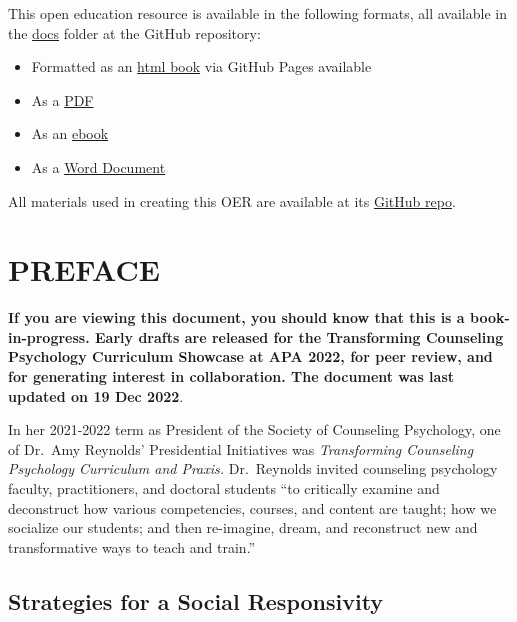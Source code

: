 \documentclass[
  11pt,
]{book}
\providecommand{\tightlist}{%
  \setlength{\itemsep}{0pt}\setlength{\parskip}{0pt}}
\begin{document}
This open education resource is available in the following formats, all available in the \href{https://github.com/lhbikos/TransformingResearchMethods/tree/main/docs}{docs} folder at the GitHub repository:

\begin{itemize}
\tightlist
\item
  Formatted as an \href{https://lhbikos.github.io/TransformingResearchMethods/}{html book} via GitHub Pages available
\item
  As a \href{https://github.com/lhbikos/TransformingResearchMethods/blob/main/docs/TransformingResearchMethods.pdf}{PDF}
\item
  As an \href{https://github.com/lhbikos/TransformingResearchMethods/blob/main/docs/TransformingResearchMethods.epub}{ebook}
\item
  As a \href{https://github.com/lhbikos/TransformingResearchMethods/blob/main/docs/TransformingResearchMethods.docx}{Word Document}
\end{itemize}

All materials used in creating this OER are available at its \href{https://github.com/lhbikos/TransformingResearchMethods}{GitHub repo}.

\hypertarget{preface}{%
\chapter*{PREFACE}\label{preface}}

\textbf{If you are viewing this document, you should know that this is a book-in-progress. Early drafts are released for the Transforming Counseling Psychology Curriculum Showcase at APA 2022, for peer review, and for generating interest in collaboration. The document was last updated on 19 Dec 2022}.

In her 2021-2022 term as President of the Society of Counseling Psychology, one of Dr.~Amy Reynolds' Presidential Initiatives was \emph{Transforming Counseling Psychology Curriculum and Praxis.} Dr.~Reynolds invited counseling psychology faculty, practitioners, and doctoral students ``to critically examine and deconstruct how various competencies, courses, and content are taught; how we socialize our students; and then re-imagine, dream, and reconstruct new and transformative ways to teach and train.''

\hypertarget{strategies-for-a-social-responsivity}{%
\section*{Strategies for a Social Responsivity}\label{strategies-for-a-social-responsivity}}
\end{document}

